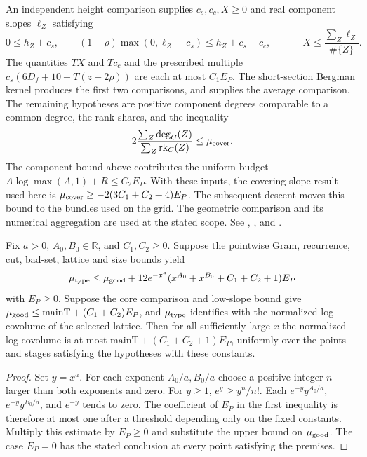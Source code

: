 An independent height comparison supplies \(c_s,c_c,X\ge0\) and real component slopes \(\ell_Z\) satisfying
\[
 0\le h_Z+c_s,\qquad
 (1-\rho)\max(0,\ell_Z+c_s)\le h_Z+c_s+c_c,\qquad
 -X\le \frac{\sum_Z\ell_Z}{\#\{Z\}}.
\]
The quantities \(TX\) and \(Tc_c\) and the prescribed multiple
\(c_s(6D_f+10+T(z+2\rho))\) are each at most \(C_1 E_P\).
The short-section Bergman kernel produces the first two comparisons, and
 supplies the average comparison. The remaining hypotheses
are positive component degrees comparable to a common degree, the rank
shares, and the inequality
\[
 2\frac{\sum_Z\deg_C(Z)}{\sum_Z\mathrm{rk}_C(Z)}
 \le \mu_{\rm cover}.
\]
The component bound above contributes the uniform budget
\(A\log\max(A,1)+R\le C_2E_P\).
With these inputs, the covering-slope result used here is
\(\mu_{\rm cover}\ge-2(3C_1+C_2+4)E_P\). The subsequent descent moves this
bound to the bundles used on the grid. The geometric comparison and its
numerical aggregation are used at the stated scope. See , , and .

\begin{proposition}\label{geo:covolume}
Fix \(a>0\), \(A_0,B_0\in\mathbb R\), and \(C_1,C_2\ge0\). Suppose the pointwise Gram, recurrence, cut, bad-set, lattice and size bounds yield
\[
 \mu_{\rm type}\le\mu_{\rm good}
 +12e^{-x^a}(x^{A_0}+x^{B_0}+C_1+C_2+1)E_P
\]
with \(E_P\ge0\). Suppose the core comparison and low-slope bound give \(\mu_{\rm good}\le \mathrm{mainT}+(C_1+C_2)E_P\), and \(\mu_{\rm type}\) identifies with the normalized log-covolume of the selected lattice. Then for all sufficiently large \(x\) the normalized log-covolume is at most \(\mathrm{mainT}+(C_1+C_2+1)E_P\), uniformly over the points and stages satisfying the hypotheses with these constants.
\end{proposition}
\begin{proof}
Set \(y=x^a\). For each exponent \(A_0/a,B_0/a\) choose a positive integer \(n\) larger than both exponents and zero. For \(y\ge1\), \(e^y\ge y^n/n!\). Each \(e^{-y}y^{A_0/a}\), \(e^{-y}y^{B_0/a}\), and \(e^{-y}\) tends to zero. The coefficient of \(E_P\) in the first inequality is therefore at most one after a threshold depending only on the fixed constants. Multiply this estimate by \(E_P\ge0\) and substitute the upper bound on \(\mu_{\rm good}\). The case \(E_P=0\) has the stated conclusion at every point satisfying the premises.
\end{proof}

